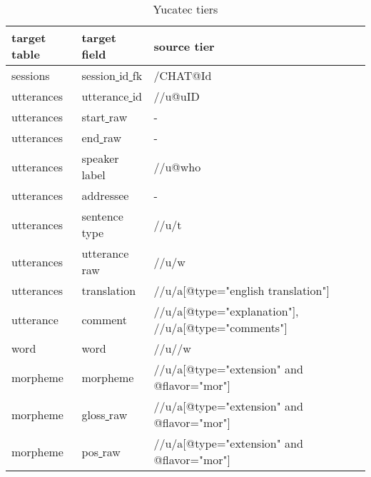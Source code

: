 \documentclass[a4paper, 11pt]{book}
\newcommand{\und}{\underline{{ }}\hspace{0.2mm}}	%
\begin{document}
\begin{table}[ht!]
	\centering
	\begin{tabular}{lll}
		\toprule
			\textbf{target table} & \textbf{target field} & \textbf{source tier} \\
		\midrule
			sessions 	& session\und id\und fk 	& /CHAT@Id \\
			utterances 	& utterance\und id	& //u@uID \\
			utterances 	& start\und raw		& - \\
			utterances 	& end\und raw		& - \\
			utterances 	& speaker\und label	& //u@who \\
			utterances 	& addressee			& - \\
			utterances 	& sentence\und type	& //u/t \\
			utterances 	& utterance\und raw	& //u/w \\
			utterances 	& translation		& //u/a[@type="english translation"] \\
			utterance 	& comment			& //u/a[@type="explanation"], //u/a[@type="comments"] \\
			word	 	& word		& //u//w \\ %
			morpheme	& morpheme			& //u/a[@type="extension" and @flavor="mor"] \\ %
			morpheme	& gloss\und raw		& //u/a[@type="extension" and @flavor="mor"] \\ %
			morpheme	& pos\und raw		& //u/a[@type="extension" and @flavor="mor"] \\ %

		\bottomrule
	\end{tabular}
	\caption{Yucatec tiers}
	\label{tab:Yucatec tiers}
\end{table}
\end{document}
